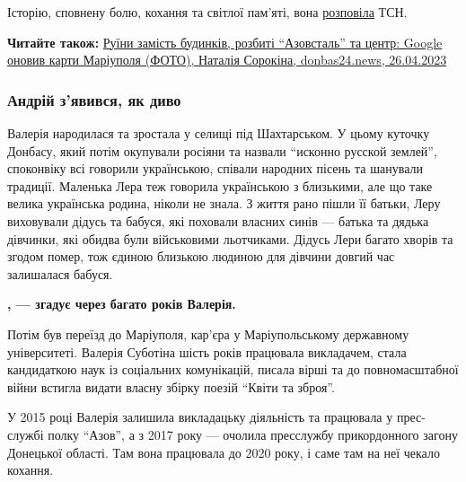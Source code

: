 Історію, сповнену болю, кохання та світлої пам'яті, вона \href{https://www.youtube.com/watch?v=SuTVEPisKJQ}{розповіла} ТСН.

\textbf{Читайте також:} \href{https://donbas24.news/news/ruyini-zamist-budinkiv-rozbiti-azovstal-ta-centr-google-onoviv-karti-mariupolya-foto}{%
Руїни замість будинків, розбиті \enquote{Азовсталь} та центр: Google оновив карти Маріуполя (ФОТО), %
Наталія Сорокіна, donbas24.news, 26.04.2023%
}

\subsubsection{Андрій з'явився, як диво}

Валерія народилася та зростала у селищі під Шахтарськом. У цьому куточку
Донбасу, який потім окупували росіяни та назвали \enquote{исконно русской землей},
споконвіку всі говорили українською, співали народних пісень та шанували
традиції. Маленька Лера теж говорила українською з близькими, але що таке
велика українська родина, ніколи не знала. З життя рано пішли її батьки, Леру
виховували дідусь та бабуся, які поховали власних синів — батька та дядька
дівчинки, які обидва були військовими льотчиками. Дідусь Лери багато хворів та
згодом помер, тож єдиною близькою людиною для дівчини довгий час залишалася
бабуся.

\begin{leftbar}
	\begingroup
		\bfseries
{},
— згадує через багато років Валерія.
	\endgroup
\end{leftbar}

Потім був переїзд до Маріуполя, кар'єра у Маріупольському державному
університеті. Валерія Суботіна шість років працювала викладачем, стала
кандидаткою наук із соціальних комунікацій, писала вірші та до повномасштабної
війни встигла видати власну збірку поезій \enquote{Квіти та зброя}.


У 2015 році Валерія залишила викладацьку діяльність та працювала у прес-службі
полку \enquote{Азов}, а з 2017 року — очолила пресслужбу прикордонного загону Донецької
області. Там вона працювала до 2020 року, і саме там на неї чекало кохання.

